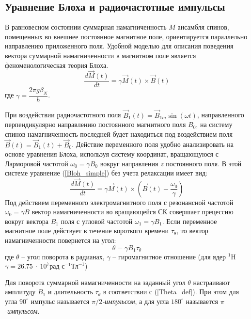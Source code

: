 \subsection{Уравнение Блоха и радиочастотные импульсы}
В равновесном состоянии суммарная намагниченность $M$ ансамбля спинов, помещенных во внешнее постоянное магнитное поле, ориентируется параллельно направлению приложенного поля. Удобной моделью для описания поведения вектора суммарной намагниченности в магнитном поле является феноменологическая теория Блоха.
\begin{equation}
\label{Bloh_simple}
\dfrac{d \vec{M}(t)}{dt} = \gamma \vec{M}(t) \times \vec{B}(t)
\end{equation}
где $\gamma = \dfrac{2 \pi g \beta_N}{h}$.

При воздействии радиочастотного поля $ \vec{B}_1(t) = \vec{B}_{1m} \sin(\omega t) $, направленного перпендикулярно направлению постоянного магнитного поля $ B_0 $, на систему спинов намагниченность последней будет находиться под воздействием поля $\vec{B}(t) = \vec{B}_1 (t) + \vec{B}_0$.
Действие переменного поля удобно анализировать на основе уравнения Блоха, используя систему координат, вращающуюся с Ларморовой частотой $ \omega_0 = \gamma B_0 $ вокруг направления $z$ постоянного поля. В этой системе уравнение (\ref{Bloh_simple}) без учета релаксации имеет вид:
\begin{equation}
\label{Bloh_rotation}
\dfrac{d \vec{M}(t)}{dt} = \gamma \vec{M}(t) \times \left(\vec{B}(t) - \dfrac{\omega_0}{\gamma} \right)
\end{equation}
Под действием переменного электромагнитного поля с резонансной частотой $ \omega_0 = \gamma B $ вектор намагниченности во вращающейся СК совершает прецессию вокруг вектора $B_1$ поля с угловой частотой $ \omega_1 = \gamma B_1 $. Если переменное магнитное поле действует в течение короткого времени $ \tau_\theta $, то вектор намагниченности повернется на угол:
\begin{equation}
\label{Theta_def}
\theta = \gamma B_1 \tau_\theta
\end{equation}
где $ \theta $ -- угол поворота в радианах, $ \gamma  $ -- гиромагнитное отношение (для ядер $^1$H $ \gamma = 26.75~\cdot~10^7 \text{рад }\text{с}^{-1}\text{Тл}^{-1} $)

Для поворота суммарной намагниченности на заданный угол $\theta$ настраивают амплитуду $ B_1 $ и длительность $ \tau_\theta $ в соответствии с (\ref{Theta_def}). При этом для угла $90 ^{\circ}$ импульс называется \textit{$\pi /2$-импульсом}, а для угла $180 ^{\circ}$ называется \textit{$ \pi $-импульсом}.

